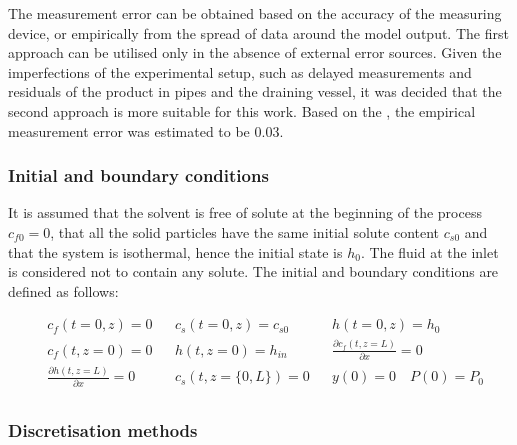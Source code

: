 \documentclass[a4paper,fleqn]{cas-dc}
\begin{document}
		The measurement error can be obtained based on the accuracy of the measuring device, or empirically from the spread of data around the model output. The first approach can be utilised only in the absence of external error sources. Given the imperfections of the experimental setup, such as delayed measurements and residuals of the product in pipes and the draining vessel, it was decided that the second approach is more suitable for this work. Based on the \citet{Sliczniuk2024}, the empirical measurement error was estimated to be 0.03.
		
		\subsubsection{Initial and boundary conditions} 
		It is assumed that the solvent is free of solute at the beginning of the process $c_{f0}=0$, that all the solid particles have the same initial solute content $c_{s0}$ and that the system is isothermal, hence the initial state is $h_0$. The fluid at the inlet is considered not to contain any solute. The initial and boundary conditions are defined as follows:
		
		{\footnotesize
			\begin{align*}
				&c_f(t = 0, z) = 0  && c_s(t = 0, z) = c_{s0} && h(t = 0, z) = h_0 \\
				&c_f(t,   z=0) = 0  && h(t, z=0) = h_{in}  && \frac{\partial c_f(t,z=L)}{\partial x} = 0 \\
				&\frac{\partial h(t,z=L)}{\partial x} = 0   && c_s(t, z=\{0,L\}) = 0 && y(0) = 0 \quad P(0) = P_0 \\
		\end{align*} }
		
		\subsubsection{Discretisation methods}
		
\end{document}

